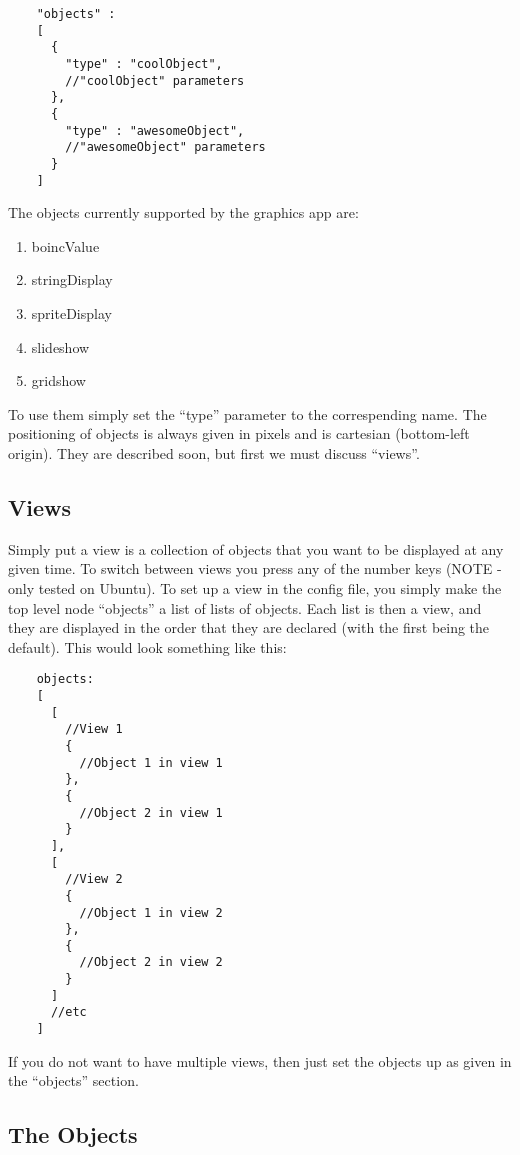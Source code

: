 \documentclass[a4paper]{article}
\begin{document}
  \begin{verbatim}
    "objects" :
    [
      {
        "type" : "coolObject",
        //"coolObject" parameters
      },
      {
        "type" : "awesomeObject",
        //"awesomeObject" parameters
      }
    ]
  \end{verbatim}

  The objects currently supported by the graphics app are:
  \begin{enumerate}
    \item boincValue
    \item stringDisplay
    \item spriteDisplay
    \item slideshow
    \item gridshow
  \end{enumerate}

  To use them simply set the ``type'' parameter to the correspending name.
  The positioning of objects is always given in pixels and is cartesian
  (bottom-left origin).
  They are described soon, but first we must discuss ``views''.

  \subsection{Views}
  Simply put a view is a collection of objects that you want to be
  displayed at any given time. To switch between views you press any of the
  number keys (NOTE - only tested on Ubuntu). To set up a view in the config
  file, you simply make the top level node ``objects'' a list of lists of
  objects. Each list is then a view, and they are displayed in the order
  that they are declared (with the first being the default). This would look
  something like this:

  \begin{verbatim}
    objects:
    [
      [
        //View 1
        {
          //Object 1 in view 1
        },
        {
          //Object 2 in view 1
        }
      ],
      [
        //View 2
        {
          //Object 1 in view 2
        },
        {
          //Object 2 in view 2
        }
      ]
      //etc
    ]
  \end{verbatim}

  If you do not want to have multiple views, then just set the objects up
  as given in the ``objects'' section.

  \subsection{The Objects}
\end{document}

